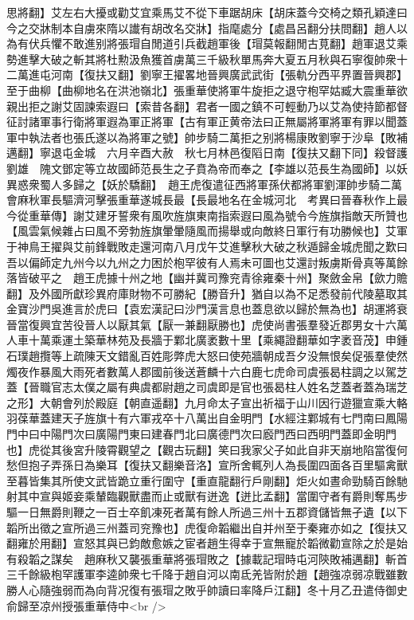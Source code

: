 思將翻】艾左右大擾或勸艾宜乘馬艾不從下車踞胡床【胡床蓋今交椅之類孔穎達曰今之交牀制本自虜來隋以䜟有胡改名交牀】指麾處分【處昌呂翻分扶問翻】趙人以為有伏兵懼不敢進别將張瑁自閒道引兵截趙軍後【瑁莫報翻閒古莧翻】趙軍退艾乘勢進擊大破之斬其將杜勲汲魚獲首虜萬三千級秋單馬奔大夏五月秋與石寧復帥衆十二萬進屯河南【復扶又翻】劉寧王擢畧地晉興廣武武街【張軌分西平界置晉興郡】至于曲柳【曲柳地名在洪池嶺北】張重華使將軍牛旋拒之退守枹罕姑臧大震重華欲親出拒之謝艾固諫索遐曰【索昔各翻】君者一國之鎮不可輕動乃以艾為使持節都督征討諸軍事行衛將軍遐為軍正將軍【古有軍正黄帝法曰正無屬將軍將軍有罪以聞蓋軍中執法者也張氏遂以為將軍之號】帥步騎二萬拒之别將楊康敗劉寧于沙阜【敗補邁翻】寧退屯金城　六月辛酉大赦　秋七月林邑復䧟日南【復扶又翻下同】殺督護劉雄　隗文鄧定等立故國師范長生之子賁為帝而奉之【李雄以范長生為國師】以妖異惑衆蜀人多歸之【妖於驕翻】　趙王虎復遣征西將軍孫伏都將軍劉渾帥步騎二萬會麻秋軍長驅濟河擊張重華遂城長最【長最地名在金城河北　考異曰晉春秋作上最今從重華傳】謝艾建牙誓衆有風吹旌旗東南指索遐曰風為號令今旌旗指敵天所贊也【風雲氣候雜占曰風不旁勃旌旗暈暈隨風而揚舉或向敵終日軍行有功勝候也】艾軍于神鳥王擢與艾前鋒戰敗走還河南八月戊午艾進擊秋大破之秋遁歸金城虎聞之歎曰吾以偏師定九州今以九州之力困於枹罕彼有人焉未可圖也艾還討叛虜斯骨真等萬餘落皆破平之　趙王虎據十州之地【幽并冀司豫兖青徐雍秦十州】聚斂金帛【歛力贍翻】及外國所獻珍異府庫財物不可勝紀【勝音升】猶自以為不足悉發前代陵墓取其金寶沙門吳進言於虎曰【袁宏漢記曰沙門漢言息也蓋息欲以歸於無為也】胡運將衰晉當復興宜苦役晉人以厭其氣【厭一兼翻厭勝也】虎使尚書張羣發近郡男女十六萬人車十萬乘運土築華林苑及長牆于鄴北廣袤數十里【乘繩證翻華如字袤音茂】申鍾石璞趙攬等上疏陳天文錯亂百姓彫弊虎大怒曰使苑牆朝成吾夕没無恨矣促張羣使然燭夜作暴風大雨死者數萬人郡國前後送蒼麟十六白鹿七虎命司虞張曷柱調之以駕芝蓋【晉職官志太僕之屬有典虞都尉趙之司虞即是官也張曷柱人姓名芝蓋者蓋為瑞芝之形】大朝會列於殿庭【朝直遥翻】九月命太子宣出祈福于山川因行遊獵宣乘大輅羽葆華蓋建天子旌旗十有六軍戎卒十八萬出自金明門【水經注鄴城有七門南曰鳳陽門中曰中陽門次曰廣陽門東曰建春門北曰廣德門次曰廏門西曰西明門蓋即金明門也】虎從其後宮升陵霄觀望之【觀古玩翻】笑曰我家父子如此自非天崩地陷當復何愁但抱子弄孫日為樂耳【復扶又翻樂音洛】宣所舍輒列人為長圍四面各百里驅禽獸至暮皆集其所使文武皆跪立重行圍守【重直龍翻行戶剛翻】炬火如晝命勁騎百餘馳射其中宣與姬妾乘輦臨觀獸盡而止或獸有迸逸【迸比孟翻】當圍守者有爵則奪馬步驅一日無爵則鞭之一百士卒飢凍死者萬有餘人所過三州十五郡資儲皆無孑遺【以下韜所出徵之宣所過三州蓋司兖豫也】虎復命韜繼出自并州至于秦雍亦如之【復扶又翻雍於用翻】宣怒其與已鈞敵愈嫉之宦者趙生得幸于宣無寵於韜微勸宣除之於是始有殺韜之謀矣　趙麻秋又襲張重華將張瑁敗之【據載記瑁時屯河陝敗補邁翻】斬首三千餘級枹罕護軍李逵帥衆七千降于趙自河以南氐羌皆附於趙【趙強凉弱凉戰雖數勝人心隨強弱而為向背况復有張瑁之敗乎帥讀曰率降戶江翻】冬十月乙丑遣侍御史俞歸至凉州授張重華侍中<br />
